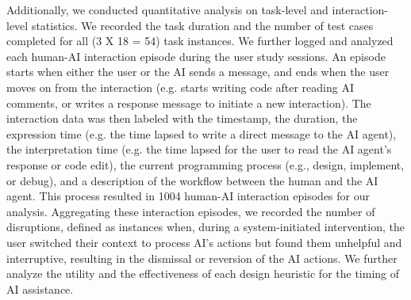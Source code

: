 Additionally, we conducted quantitative analysis on task-level and interaction-level statistics. We recorded the task duration and the number of test cases completed for all (3 X 18 = 54) task instances. 
We further logged and analyzed each human-AI interaction episode during the user study sessions.
An episode starts when either the user or the AI sends a message, and ends when the user moves on from the interaction (e.g. starts writing code after reading AI comments, or writes a response message to initiate a new interaction). 
The interaction data was then labeled with the timestamp, the duration, the expression time (e.g. the time lapsed to write a direct message to the AI agent), the interpretation time (e.g. the time lapsed for the user to read the AI agent's response or code edit), the current programming process (e.g., design, implement, or debug), and a description of the workflow between the human and the AI agent. 
This process resulted in 1004 human-AI interaction episodes for our analysis. 
Aggregating these interaction episodes, we recorded the number of disruptions, defined as instances when, during a system-initiated intervention, the user switched their context to process AI's actions but found them unhelpful and interruptive, resulting in the dismissal or reversion of the AI actions. 
We further analyze the utility and the effectiveness of each design heuristic for the timing of AI assistance.
